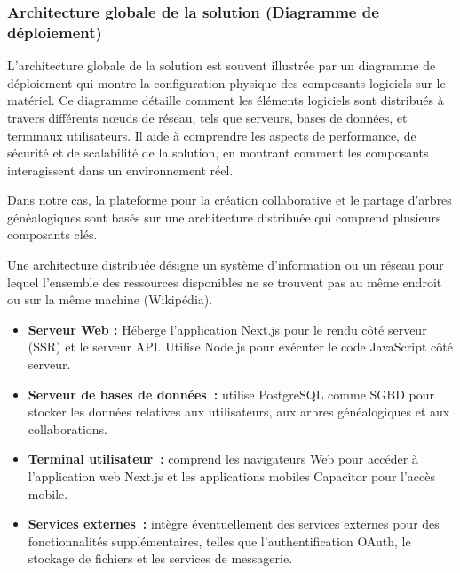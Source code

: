 \subsubsection{Architecture globale de la solution (Diagramme de déploiement)}
L’architecture globale de la solution est souvent illustrée par un diagramme de
déploiement qui montre la configuration physique des composants logiciels sur
le matériel. Ce diagramme détaille comment les éléments logiciels sont
distribués à travers différents nœuds de réseau, tels que serveurs, bases de
données, et terminaux utilisateurs. Il aide à comprendre les aspects de
performance, de sécurité et de scalabilité de la solution, en montrant comment
les composants interagissent dans un environnement réel.

Dans notre cas, la plateforme pour la création collaborative et le partage
d’arbres généalogiques sont basés sur une architecture distribuée qui
comprend plusieurs composants clés.

Une architecture distribuée  désigne un système d'information ou un réseau pour
lequel l'ensemble des ressources disponibles ne se trouvent pas au même endroit
ou sur la même machine (Wikipédia).


\begin{itemize}
  \item \textbf{ Serveur Web :} Héberge l'application Next.js pour le rendu
    côté serveur (SSR) et le serveur API. Utilise Node.js pour exécuter le
    code JavaScript côté serveur.

  \item \textbf{Serveur de bases de données :} utilise PostgreSQL comme SGBD
    pour stocker les données relatives aux utilisateurs, aux arbres
    généalogiques et aux collaborations.

  \item \textbf{ Terminal utilisateur :} comprend les navigateurs Web pour
    accéder à l’application web Next.js et les applications mobiles Capacitor
    pour l’accès mobile.

  \item \textbf{Services externes :} intègre éventuellement des services
    externes pour des fonctionnalités supplémentaires, telles que
    l’authentification OAuth, le stockage de fichiers et les
    services de messagerie.

\end{itemize}

